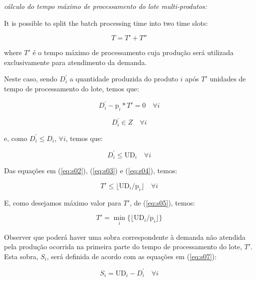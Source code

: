 \documentclass[authoryear,manuscript,12pt]{elsarticle}
\begin{document}
\noindent \emph{cálculo do tempo máximo de processamento do lote multi-produtos:}

It is possible to split the batch processing time into two time slots:

\begin{equation}
T = T' + T''
\end{equation}

\noindent where $T'$ é o tempo máximo de processamento cuja produção será utilizada exclusivamente para atendimento da demanda.

Neste caso, sendo $D_{i}^{'}$ a quantidade produzida do produto $i$ após $T'$ unidades de tempo de processamento do lote, temos que:

\begin{equation}
\label{eq:s02}
D_{i}^{'} - \textrm{p}_i * T'  = 0 \quad \forall i
\end{equation}

\begin{equation}
\label{eq:s03}
D_{i}^{'} \in Z \quad \forall i
\end{equation}

\noindent e, como $D_{i}^{'} \leq D_i$, $\forall i$, temos que:

\begin{equation}
\label{eq:s04}
D_{i}^{'} \leq \textrm{UD}_i\quad \forall i
\end{equation}

Das equações em (\ref{eq:s02}), (\ref{eq:s03}) e (\ref{eq:s04}), temos:

\begin{equation}
\label{eq:s05}
T' \leq \lfloor{\textrm{UD}_i / \textrm{p}_i}\rfloor \quad \forall i
\end{equation}

E, como desejamos máximo valor para $T'$, de (\ref{eq:s05}), temos:

\begin{equation}
\label{eq:s06}
T' = \min_i\{\lfloor{\textrm{UD}_i / \textrm{p}_i}\rfloor\}
\end{equation}

Observer que poderá haver uma sobra correspondente à demanda não atendida pela produção ocorrida na primeira parte do tempo de processamento do lote, $T'$. Esta sobra, $S_i$, será definida de acordo com as equações em (\ref{eq:s07}):

\begin{equation}
\label{eq:s07}
S_i = \textrm{UD}_i - D_{i}^{'} \quad \forall i
\end{equation}
\end{document}
